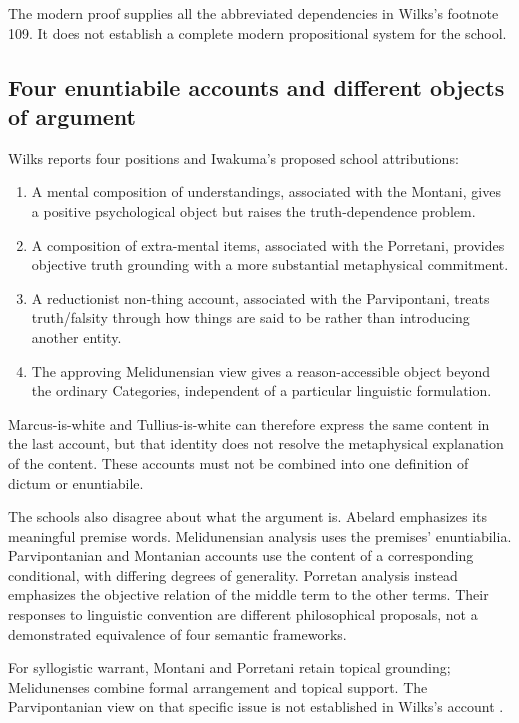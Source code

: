 The modern proof supplies all the abbreviated dependencies
in Wilks's footnote 109. It does not establish a complete
modern propositional system for the school.

\subsection{Four enuntiabile accounts and different objects of argument}

Wilks reports four positions and Iwakuma's proposed school
attributions:

\begin{enumerate}
\item A mental composition of understandings, associated
  with the Montani, gives a positive psychological object
  but raises the truth-dependence problem.
\item A composition of extra-mental items, associated with
  the Porretani, provides objective truth grounding with
  a more substantial metaphysical commitment.
\item A reductionist non-thing account, associated with the
  Parvipontani, treats truth/falsity through how things are
  said to be rather than introducing another entity.
\item The approving Melidunensian view gives a reason-accessible
  object beyond the ordinary Categories, independent of
  a particular linguistic formulation.
\end{enumerate}

Marcus-is-white and Tullius-is-white can therefore express
the same content in the last account, but that identity
does not resolve the metaphysical explanation of the content.
These accounts must not be combined into one definition
of dictum or enuntiabile.

The schools also disagree about what the argument is.
Abelard emphasizes its meaningful premise words.
Melidunensian analysis uses the premises' enuntiabilia.
Parvipontanian and Montanian accounts use the content of
a corresponding conditional, with differing degrees of
generality. Porretan analysis instead emphasizes the
objective relation of the middle term to the other terms.
Their responses to linguistic convention are different
philosophical proposals, not a demonstrated equivalence
of four semantic frameworks.

For syllogistic warrant, Montani and Porretani retain
topical grounding; Melidunenses combine formal arrangement
and topical support. The Parvipontanian view on that
specific issue is not established in Wilks's account
\cite[pp.~146--149]{Wilks2007FordhamAbelard}.

